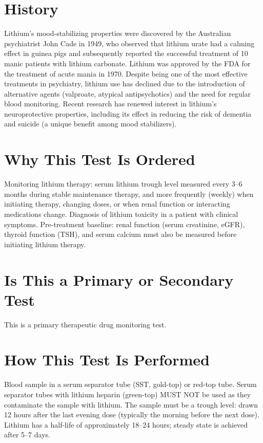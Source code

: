 \section*{History}
Lithium's mood-stabilizing properties were discovered by the Australian psychiatrist John Cade in 1949, who observed that lithium urate had a calming effect in guinea pigs and subsequently reported the successful treatment of 10 manic patients with lithium carbonate. Lithium was approved by the FDA for the treatment of acute mania in 1970. Despite being one of the most effective treatments in psychiatry, lithium use has declined due to the introduction of alternative agents (valproate, atypical antipsychotics) and the need for regular blood monitoring. Recent research has renewed interest in lithium's neuroprotective properties, including its effect in reducing the risk of dementia and suicide (a unique benefit among mood stabilizers).

\section*{Why This Test Is Ordered}
Monitoring lithium therapy: serum lithium trough level measured every 3--6 months during stable maintenance therapy, and more frequently (weekly) when initiating therapy, changing doses, or when renal function or interacting medications change. Diagnosis of lithium toxicity in a patient with clinical symptoms. Pre-treatment baseline: renal function (serum creatinine, eGFR), thyroid function (TSH), and serum calcium must also be measured before initiating lithium therapy.

\section*{Is This a Primary or Secondary Test}
This is a primary therapeutic drug monitoring test.

\section*{How This Test Is Performed}
Blood sample in a serum separator tube (SST, gold-top) or red-top tube. Serum separator tubes with lithium heparin (green-top) MUST NOT be used as they contaminate the sample with lithium. The sample must be a trough level: drawn 12 hours after the last evening dose (typically the morning before the next dose). Lithium has a half-life of approximately 18--24 hours; steady state is achieved after 5--7 days.

